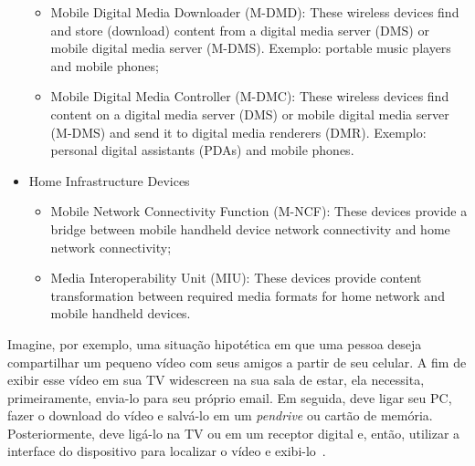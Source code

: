 \begin{itemize}
\begin{itemize}
		\item Mobile Digital Media Downloader (M-DMD): These wireless devices find and store (download) content from a digital media server (DMS) or mobile digital media server (M-DMS). Exemplo: portable music players and mobile phones;
		\item Mobile Digital Media Controller (M-DMC): These wireless devices find content on a digital media server (DMS) or mobile digital media server (M-DMS) and send it to digital media renderers (DMR). Exemplo: personal digital assistants (PDAs) and mobile phones.
	\end{itemize}
	\item Home Infrastructure Devices
	\begin{itemize}
		\item Mobile Network Connectivity Function (M-NCF): These devices provide a bridge between mobile handheld device network connectivity and home network connectivity;
		\item Media Interoperability Unit (MIU): These devices provide content transformation between required media formats for home network and mobile handheld devices.
	\end{itemize}
\end{itemize}

Imagine, por exemplo, uma situação hipotética em que uma pessoa deseja compartilhar um pequeno vídeo com seus amigos a partir de seu celular. A fim de exibir esse vídeo em sua TV widescreen na sua sala de estar, ela necessita, primeiramente, envia-lo para seu próprio email. Em seguida, deve ligar seu PC, fazer o download do vídeo e salvá-lo em um \emph{pendrive} ou cartão de memória. Posteriormente, deve ligá-lo na TV ou em um receptor digital e, então, utilizar a interface do dispositivo para localizar o vídeo e exibi-lo~\cite{dlnahdvideostreaming}.

